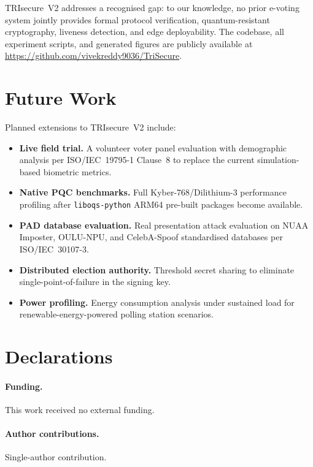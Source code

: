 \documentclass[preprint,12pt]{elsarticle}
\begin{document}
TRIsecure~V2 addresses a recognised gap: to our knowledge, no prior e-voting system jointly
provides formal protocol verification, quantum-resistant cryptography,
liveness detection, and edge deployability. The codebase, all experiment
scripts, and generated figures are publicly available at
\url{https://github.com/vivekreddy9036/TriSecure}.

\section{Future Work}
\label{sec:future}

Planned extensions to TRIsecure~V2 include:
\begin{itemize}
  \item \textbf{Live field trial.} A volunteer voter panel evaluation with
    demographic analysis per ISO/IEC~19795-1 Clause~8 to replace the current
    simulation-based biometric metrics.
  \item \textbf{Native PQC benchmarks.} Full Kyber-768/Dilithium-3 performance
    profiling after \texttt{liboqs-python} ARM64 pre-built packages become
    available.
  \item \textbf{PAD database evaluation.} Real presentation attack evaluation
    on NUAA Imposter, OULU-NPU, and CelebA-Spoof standardised databases per
    ISO/IEC~30107-3.
  \item \textbf{Distributed election authority.} Threshold secret sharing to
    eliminate single-point-of-failure in the signing key.
  \item \textbf{Power profiling.} Energy consumption analysis under sustained
    load for renewable-energy-powered polling station scenarios.
\end{itemize}

\section*{Declarations}

\paragraph{Funding.} This work received no external funding.

\paragraph{Author contributions.} Single-author contribution.
\end{document}
